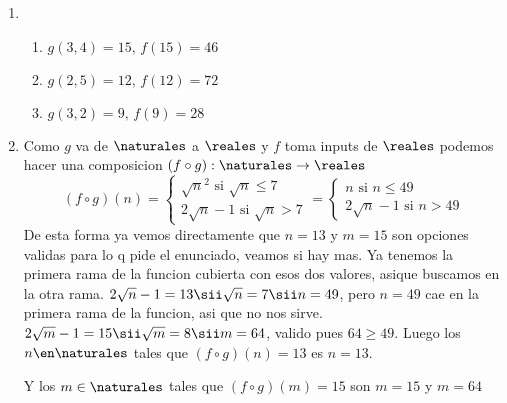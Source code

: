 \begin{enumerate}[label=\roman*)]
  \item \begin{enumerate}
          \item $g(3, 4) = 15, \, f(15) = 46$
          \item $g(2,5) = 12, \, f(12) = 72$
          \item $g(3,2) = 9, \, f(9) = 28$
        \end{enumerate}

  \item \begin{enumerate}
          Como $g$ va de $\naturales$ a $\reales$ y $f$ toma inputs de $\reales$ podemos hacer una composicion
          $(f \circ g): \naturales \to \reales$
          $$
            (f \circ g)(n) =
            \begin{cases}
              \sqrt{n}^2 \text{ si } \sqrt{n} \leq 7 \\
              2\sqrt{n} - 1 \text{ si } \sqrt{n} > 7
            \end{cases}
            =
            \begin{cases}
              n \text{ si } n \leq 49 \\
              2\sqrt{n} - 1 \text{ si } n > 49
            \end{cases}
          $$
          De esta forma ya vemos directamente que $n = 13$ y $m = 15$ son opciones validas para lo q pide el enunciado, veamos
          si hay mas.
          Ya tenemos la primera rama de la funcion cubierta con esos dos valores, asique buscamos en la otra rama.
          $2\sqrt{n} - 1 = 13 \sii \sqrt{n} = 7 \sii n = 49$, pero $n = 49$ cae en la primera rama de la funcion, asi que no nos sirve.
          $2\sqrt{m} - 1 = 15 \sii \sqrt{m} = 8 \sii m =64$, valido pues $64 \geq 49$.
          Luego los $n \en \naturales$ tales que $(f \circ g)(n) = 13$ es $n = 13$.

          Y los  $m \in \naturales$ tales que $(f \circ g)(m) = 15$ son $m = 15$ y $m = 64$
        \end{enumerate}
\end{enumerate}

\begin{aportes}
  \item {}
\end{aportes}
